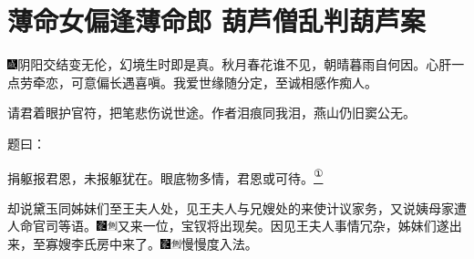 
\chapter{薄命女偏逢薄命郎 葫芦僧乱判葫芦案}

{\includegraphics[width=3mm]{../Images/00005}\kaishu 阴阳交结变无伦，幻境生时即是真。秋月春花谁不见，朝晴暮雨自何因。心肝一点劳牵恋，可意偏长遇喜嗔。我爱世缘随分定，至诚相感作痴人。}

{\kaishu 请君着眼护官符，把笔悲伤说世途。作者泪痕同我泪，燕山仍旧窦公无。}

题曰：

捐躯报君恩，未报躯犹在。眼底物多情，君恩或可待。\href{../Text/part0008_split_000.html\#lnkback_1_a}{\textsuperscript{①}}

却说黛玉同姊妹们至王夫人处，见王夫人与兄嫂处的来使计议家务，又说姨母家遭人命官司等语。{\includegraphics[width=3mm]{../Images/00006}\includegraphics[width=3mm]{../Images/00011}\footnotesize \kaishu 又来一位，宝钗将出现矣。}因见王夫人事情冗杂，姊妹们遂出来，至寡嫂李氏房中来了。{\includegraphics[width=3mm]{../Images/00006}\includegraphics[width=3mm]{../Images/00011}\footnotesize \kaishu 慢慢度入法。}


